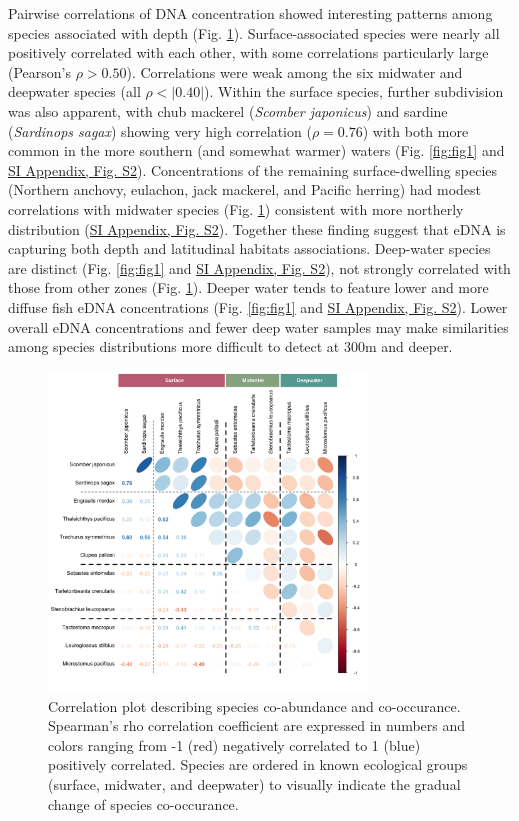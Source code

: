 \documentclass[9pt,twocolumn,twoside]{pnas-new}
\begin{document}
Pairwise correlations of DNA concentration showed interesting patterns among species associated with depth (Fig. \ref{fig:fig2}). Surface-associated species were nearly all positively correlated with each other, with some correlations particularly large (Pearson's $\rho > 0.50$). Correlations were weak among the six midwater and deepwater species (all $\rho < |0.40|$). Within the surface species, further subdivision was also apparent, with chub mackerel (\textit{Scomber japonicus}) and sardine (\textit{Sardinops sagax}) showing very high correlation ($\rho = 0.76$) with both more common in the more southern (and somewhat warmer) waters (Fig. \ref{fig:fig1} and \href{SI_Appendix.pdf}{SI Appendix, Fig. S2}). Concentrations of the remaining surface-dwelling species (Northern anchovy, eulachon, jack mackerel, and Pacific herring) had modest correlations with midwater species (Fig. \ref{fig:fig2}) consistent with more northerly distribution (\href{SI_Appendix.pdf}{SI Appendix, Fig. S2}). Together these finding suggest that eDNA is capturing both depth and latitudinal habitats associations. Deep-water species are distinct (Fig. \ref{fig:fig1} and \href{SI_Appendix.pdf}{SI Appendix, Fig. S2}), not strongly correlated with those from other zones (Fig. \ref{fig:fig2}). Deeper water tends to feature lower and more diffuse fish eDNA concentrations (Fig. \ref{fig:fig1} and \href{SI_Appendix.pdf}{SI Appendix, Fig. S2}). Lower overall eDNA concentrations and fewer deep water samples may make similarities among species distributions more difficult to detect at 300m and deeper.

\begin{figure}[tbhp]  %
\centering
\includegraphics[width=8.5cm]{plots/2_Figure_2.jpg}  %
\caption{Correlation plot describing species co-abundance and co-occurance. Spearman’s rho correlation coefficient are expressed in numbers and colors ranging from -1 (red) negatively correlated to 1 (blue) positively correlated. Species are ordered in known ecological groups (surface, midwater, and deepwater) to visually indicate the gradual change of species co-occurance.}
\label{fig:fig2}
\end{figure}
\end{document}
